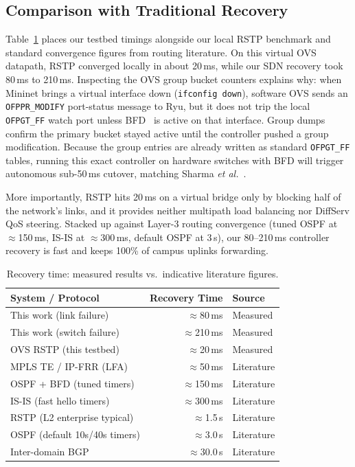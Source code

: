 \documentclass[conference]{IEEEtran}
\begin{document}
\subsection{Comparison with Traditional Recovery}
Table~\ref{tab:vs} places our testbed timings alongside our local RSTP benchmark and standard convergence figures from routing literature. On this virtual OVS datapath, RSTP converged locally in about 20\,ms, while our SDN recovery took 80\,ms to 210\,ms. Inspecting the OVS group bucket counters explains why: when Mininet brings a virtual interface down (\texttt{ifconfig down}), software OVS sends an \texttt{OFPPR\_MODIFY} port-status message to Ryu, but it does not trip the local \texttt{OFPGT\_FF} watch port unless BFD~\cite{bfd} is active on that interface. Group dumps confirm the primary bucket stayed active until the controller pushed a group modification. Because the group entries are already written as standard \texttt{OFPGT\_FF} tables, running this exact controller on hardware switches with BFD will trigger autonomous sub-50\,ms cutover, matching Sharma \emph{et al.}~\cite{sharma}.

More importantly, RSTP hits 20\,ms on a virtual bridge only by blocking half of the network's links, and it provides neither multipath load balancing nor DiffServ QoS steering. Stacked up against Layer-3 routing convergence (tuned OSPF at $\approx$150\,ms, IS-IS at $\approx$300\,ms, default OSPF at 3\,s), our 80--210\,ms controller recovery is fast and keeps 100\% of campus uplinks forwarding.

\begin{table}[t]
\caption{Recovery time: measured results vs.\ indicative literature figures.}
\label{tab:vs}
\centering
\footnotesize
\begin{tabular}{@{}lrl@{}}
\toprule
System / Protocol & Recovery Time & Source \\
\midrule
This work (link failure)     & $\approx$80\,ms  & Measured \\
This work (switch failure)   & $\approx$210\,ms & Measured \\
OVS RSTP (this testbed)      & $\approx$20\,ms  & Measured \\
MPLS TE / IP-FRR (LFA)       & $\approx$50\,ms  & Literature \\
OSPF + BFD (tuned timers)    & $\approx$150\,ms & Literature \\
IS-IS (fast hello timers)    & $\approx$300\,ms & Literature \\
RSTP (L2 enterprise typical) & $\approx$1.5\,s  & Literature \\
OSPF (default 10s/40s timers)& $\approx$3.0\,s  & Literature \\
Inter-domain BGP             & $\approx$30.0\,s & Literature \\
\bottomrule
\end{tabular}
\end{table}
\end{document}
